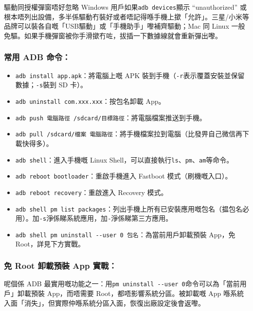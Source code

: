 \begin{tcbwarn}{驅動同授權彈窗唔好忽略}
Windows 用戶如果\texttt{adb devices}顯示 “unauthorized” 或根本唔列出設備，多半係驅動冇裝好或者唔記得喺手機上撳「允許」。三星/小米等品牌可以裝各自嘅「USB驅動」或「手機助手」嚟補齊驅動；Mac 同 Linux 一般免驅。如果手機彈窗被你手滑撳冇咗，拔插一下數據線就會重新彈出嚟。

\end{tcbwarn}

\subsubsection*{常用 ADB 命令：}

\begin{itemize}
  \item \texttt{adb install app.\allowbreak apk}：將電腦上嘅 APK 裝到手機（\texttt{-\allowbreak r}表示覆蓋安裝並保留數據；\texttt{-\allowbreak s}裝到 SD 卡）。
  \item \texttt{adb uninstall com.\allowbreak xxx.\allowbreak xxx}：按包名卸載 App。
  \item \texttt{adb push 電腦路徑 /\allowbreak sdcard/\allowbreak 目標路徑}：將電腦檔案推送到手機。
  \item \texttt{adb pull /\allowbreak sdcard/\allowbreak 檔案 電腦路徑}：將手機檔案拉到電腦（比發畀自己微信再下載快得多）。
  \item \texttt{adb shell}：進入手機嘅 Linux Shell，可以直接執行\texttt{ls}、\texttt{pm}、\texttt{am}等命令。
  \item \texttt{adb reboot bootloader}：重啟手機進入 Fastboot 模式（刷機嘅入口）。
  \item \texttt{adb reboot recovery}：重啟進入 Recovery 模式。
  \item \texttt{adb shell pm list packages}：列出手機上所有已安裝應用嘅包名（揾包名必用）。加\texttt{-\allowbreak s}淨係睇系統應用，加\texttt{-}淨係睇第三方應用。
  \item \texttt{adb shell pm uninstall -\allowbreak -\allowbreak user 0 包名}：為當前用戶卸載預裝 App，免 Root，詳見下方實戰。
\end{itemize}

\subsubsection*{免 Root 卸載預裝 App 實戰：}

呢個係 ADB 最實用嘅功能之一：用\texttt{pm uninstall -\allowbreak -\allowbreak user 0}命令可以為「當前用戶」卸載預裝 App，而唔需要 Root，都唔影響系統分區。被卸載嘅 App 喺系統入面「消失」，但實際仲喺系統分區入面，恢復出廠設定後會返嚟。

